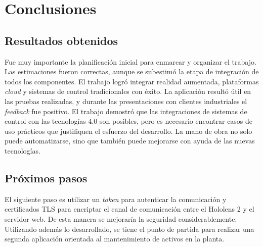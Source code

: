 
\chapter{Conclusiones} %

\label{Chapter5} %




\section{Resultados obtenidos}

Fue muy importante la planificación inicial para enmarcar y organizar el trabajo. Las estimaciones fueron correctas, aunque se subestimó la etapa de integración de todos los componentes. El trabajo logró integrar realidad aumentada, plataformas \textit{cloud} y sistemas de control tradicionales con éxito. La aplicación resultó útil en las pruebas realizadas, y durante las presentaciones con clientes industriales el \textit{feedback} fue positivo. El trabajo demostró que las integraciones de sistemas de control con las tecnologías 4.0 son posibles, pero es necesario encontrar casos de uso prácticos que justifiquen el esfuerzo del desarrollo. La mano de obra no solo puede automatizarse, sino que también puede mejorarse con ayuda de las nuevas tecnologías.

\section{Próximos pasos}

El siguiente paso es utilizar un \textit{token} para autenticar la comunicación y certificados TLS  para encriptar el canal de comunicación entre el Hololens 2 y el servidor web. De esta manera se mejoraría la seguridad considerablemente. Utilizando además lo desarrollado, se tiene el punto de partida para realizar una segunda aplicación orientada al mantenimiento de activos en la planta.
